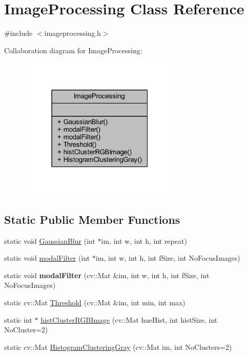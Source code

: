 \hypertarget{class_image_processing}{}\section{Image\+Processing Class Reference}
\label{class_image_processing}


{\ttfamily \#include $<$imageprocessing.\+h$>$}



Collaboration diagram for Image\+Processing\+:
\nopagebreak
\begin{figure}[H]
\begin{center}
\leavevmode
\includegraphics[width=220pt]{class_image_processing__coll__graph}
\end{center}
\end{figure}
\subsection*{Static Public Member Functions}
\begin{DoxyCompactItemize}
\item 
static void \hyperlink{class_image_processing_a07eb3c4d3eb55ea7bb8dd9e57190bb3a}{Gaussian\+Blur} (int $\ast$im, int w, int h, int repeat)
\item 
static void \hyperlink{class_image_processing_ae1460831474adb16ed769cd6956ddbff}{modal\+Filter} (int $\ast$im, int w, int h, int f\+Size, int No\+Focus\+Images)
\item 
\mbox{\label{class_image_processing_a67b372b99a529c42c825623f49f58d4d}} 
static void {\bfseries modal\+Filter} (cv\+::\+Mat \&im, int w, int h, int f\+Size, int No\+Focus\+Images)
\item 
static cv\+::\+Mat \hyperlink{class_image_processing_ae664598cc3952b81d2bbe59dfd0f0d94}{Threshold} (cv\+::\+Mat \&im, int min, int max)
\item 
static int $\ast$ \hyperlink{class_image_processing_ad95299703a3db5104a65c162dd07d5f9}{hist\+Cluster\+R\+G\+B\+Image} (cv\+::\+Mat hue\+Hist, int hist\+Size, int No\+Cluster=2)
\item 
static cv\+::\+Mat \hyperlink{class_image_processing_a4f0e35a8e54832a3d447c6fbeba5f11a}{Histogram\+Clustering\+Gray} (cv\+::\+Mat im, int No\+Clusters=2)
\end{DoxyCompactItemize}


